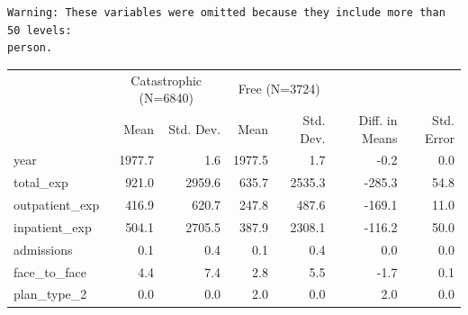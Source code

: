 \documentclass[
  letterpaper,
  DIV=11,
  numbers=noendperiod]{scrartcl}
\begin{document}
\begin{verbatim}
Warning: These variables were omitted because they include more than 50 levels:
person.
\end{verbatim}

\begin{table}
\centering
\begin{tabular}[t]{lrrrrrr}
\toprule
\multicolumn{1}{c}{ } & \multicolumn{2}{c}{Catastrophic (N=6840)} & \multicolumn{2}{c}{Free (N=3724)} & \multicolumn{2}{c}{ } \\
\cmidrule(l{3pt}r{3pt}){2-3} \cmidrule(l{3pt}r{3pt}){4-5}
  & Mean & Std. Dev. & Mean & Std. Dev. & Diff. in Means & Std. Error\\
\midrule
year & 1977.7 & 1.6 & 1977.5 & 1.7 & -0.2 & 0.0\\
total\_exp & 921.0 & 2959.6 & 635.7 & 2535.3 & -285.3 & 54.8\\
outpatient\_exp & 416.9 & 620.7 & 247.8 & 487.6 & -169.1 & 11.0\\
inpatient\_exp & 504.1 & 2705.5 & 387.9 & 2308.1 & -116.2 & 50.0\\
admissions & 0.1 & 0.4 & 0.1 & 0.4 & 0.0 & 0.0\\
face\_to\_face & 4.4 & 7.4 & 2.8 & 5.5 & -1.7 & 0.1\\
plan\_type\_2 & 0.0 & 0.0 & 2.0 & 0.0 & 2.0 & 0.0\\
\bottomrule
\end{tabular}
\end{table}
\end{document}
